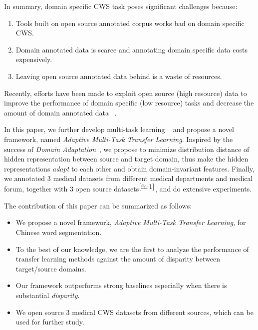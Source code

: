 In summary, domain specific CWS task poses significant challenges because:
\begin{enumerate}
\item Tools built on open source annotated corpus works bad on domain specific CWS.
\item Domain annotated data is scarce and annotating domain specific data costs expensively.
\item Leaving open source annotated data behind is a waste of resources.
\end{enumerate}

Recently, efforts have been made to exploit open source (high resource) data to improve the performance of domain specific (low resource) tasks and decrease the amount of domain annotated data ~\cite{DBLP:journals/corr/YangSC17, DBLP:journals/corr/PengD16a,DBLP:journals/corr/MouMYLXZJ16}.

In this paper, we further develop multi-task learning ~\cite{Caruana1997,DBLP:journals/corr/PengD16a} and propose a novel framework, named \textit{Adaptive Multi-Task Transfer Learning}. Inspired by the success of \textit{Domain Adaptation}~\cite{Saenko:2010:AVC:1888089.1888106, DBLP:journals/corr/TzengHZSD14, DBLP:journals/corr/Long015}, we propose to minimize distribution distance of hidden representation between source and target domain, thus make the hidden representations \textit{adapt} to each other and obtain domain-invariant features. Finally, we annotated 3 medical datasets from different medical departments and medical forum, together with 3 open source datasets$^{\ref{fn:1}}$, and do extensive experiments.

The contribution of this paper can be summarized as follows:

\begin{itemize}
\item We propose a novel framework, \textit{Adaptive Multi-Task Transfer Learning}, for Chinese word segmentation.
\item To the best of our knowledge, we are the first to analyze the performance of transfer learning methods against the amount of disparity between 
target/source domains.
\item Our framework outperforms strong baselines especially when there is substantial \textit{disparity}. 
\item We open source 3 medical CWS datasets from different sources, which can be used for further study.
\end{itemize}

